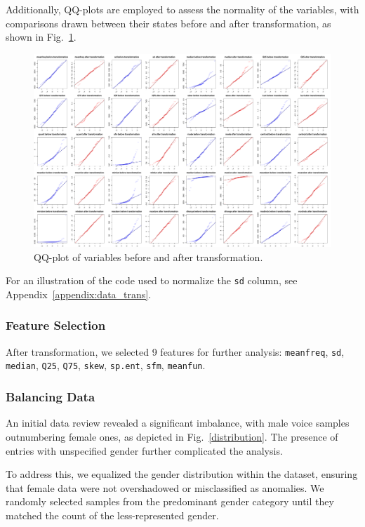 \documentclass{article}
\begin{document}
	Additionally, QQ-plots are employed to assess the normality of the variables, with comparisons drawn between their states before and after transformation, as shown in Fig.~\ref{transformation_qq}.
	\begin{figure}
		\centering
		\includegraphics[width=\textwidth]{graphs/transformations_qq.pdf}
		\caption{QQ-plot of variables before and after transformation.}
		\label{transformation_qq}
	\end{figure}
	
	For an illustration of the code used to normalize the \texttt{sd} column, see Appendix~\ref{appendix:data_trans}.	
	
	\subsubsection{Feature Selection}
	
	After transformation, we selected 9 features for further analysis: \texttt{meanfreq}, \texttt{sd}, \texttt{median}, \texttt{Q25}, \texttt{Q75}, \texttt{skew}, \texttt{sp.ent}, \texttt{sfm}, \texttt{meanfun}.
	
	\subsubsection{Balancing Data}
	
	An initial data review revealed a significant imbalance, with male voice samples outnumbering female ones, as depicted in Fig.~\ref{distribution}. The presence of entries with unspecified gender further complicated the analysis.
	
	To address this, we equalized the gender distribution within the dataset, ensuring that female data were not overshadowed or misclassified as anomalies. We randomly selected samples from the predominant gender category until they matched the count of the less-represented gender.
	
\end{document}
